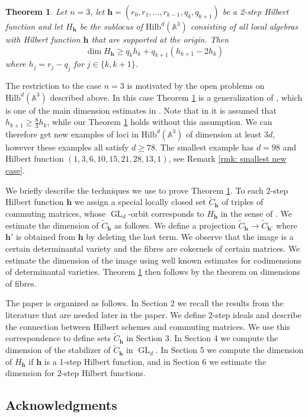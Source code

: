 \documentclass[11pt]{amsart}
\newtheorem{thm}{Theorem}[section]
\theoremstyle{definition}
\DeclareMathOperator{\GL}{GL}
\newcommand{\A}{\mathbb{A}}
\newcommand{\Hilb}[2]{\mathrm{Hilb}^{#1}(\A^{#2})}
\newcommand{\h}{\mathbf{h}}
\newcommand{\tC}{\widetilde{C}}
\begin{document}
\begin{thm}\label{thm: main}
Let $n=3$, let $\h=(r_0,r_1,\ldots ,r_{k-1},q_k,q_{k+1})$ be a 2-step Hilbert function and let $H_\h$ be the sublocus of $\Hilb{d}{3}$ consisting of all local algebras with Hilbert function $\h$ that are supported at the origin. Then
$$\dim H_\h\ge q_kh_k+q_{k+1}(h_{k+1}-2h_k)$$
where $h_j=r_j-q_j$ for $j\in\{k,k+1\}$.
\end{thm}

The restriction to the case $n=3$ is motivated by the open problems on $\Hilb{d}{3}$ described above. In this case Theorem \ref{thm: main} is a generalization of \cite[Corollary 3.18]{GGGL}, which is one of the main dimension estimates in \cite{GGGL}. Note that in \cite[Corollary 3.18]{GGGL} it is assumed that $h_{k+1}\ge \frac{8}{3}h_k$, while our Theorem \ref{thm: main} holds without this assumption. We can therefore get new examples of loci in $\Hilb{d}{3}$ of dimension at least $3d$, however these examples all satisfy $d\ge 78$. The smallest example has $d=98$ and Hilbert function $(1,3,6,10,15,21,28,13,1)$, see Remark \ref{rmk: smallest new case}.

We briefly describe the techniques we use to prove Theorem \ref{thm: main}. To each 2-step Hilbert function $\h$ we assign a special locally closed set $\tC_\h$ of triples of commuting matrices, whose $\GL_d$-orbit corresponds to $H_\h$ in the sense of \cite{GKS, HJ, JS, Nak}. We estimate the dimension of $\tC_\h$ as follows. We define a projection $\tC_\h\to \tC_{\h'}$ where $\h'$ is obtained from $\h$ by deleting the last term. We observe that the image is a certain determinantal variety and the fibres are cokernels of certain matrices. We estimate the dimension of the image using well known estimates for codimensions of determinantal varieties. Theorem \ref{thm: main} then follows by the theorem on dimensions of fibres.

The paper is organized as follows. In Section 2 we recall the results from the literature that are needed later in the paper. We define 2-step ideals and describe the connection between Hilbert schemes and commuting matrices. We use this correspondence to define sets $\tC_\h$ in Section 3. In Section 4 we compute the dimension of the stabilizer of $\tC_\h$ in $\GL_d$. In Section 5 we compute the dimension of $H_\h$ if $\h$ is a 1-step Hilbert function, and in Section 6 we estimate the dimension for 2-step Hilbert functions.

\subsection*{Acknowledgments}
\end{document}
